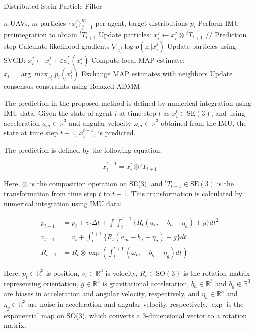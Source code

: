 \documentclass[a4paper,fleqn,10pt,twocolumn]{SICE_ISCS}
\begin{document}
\begin{algorithm}
\caption{Distributed Stein Particle Filter}
\begin{algorithmic}[1]
\REQUIRE $n$ UAVs, $m$ particles $\{x_i^j\}_{j=1}^m$ per agent, target distributions $p_i$
    \STATE Perform IMU preintegration to obtain $^t T_{t+1}$
    \STATE Update particles: $x_i^j \leftarrow x_i^j \otimes \, ^t T_{t+1}$ \quad // Prediction step
        \STATE Calculate likelihood gradients $\nabla_{x_i^j} \log p(z_i | x_i^j)$
        \STATE Update particles using SVGD: $x_i^j \leftarrow x_i^j + \varepsilon \phi_i^*(x_i^j)$
        \STATE Compute local MAP estimate: $\hat{x}_i = \arg\max_{x_i^j} p_i(x_i^j)$
        \STATE Exchange MAP estimates with neighbors
        \STATE Update consensus constraints using Relaxed ADMM
    \ENDFOR
\ENDFOR
\end{algorithmic}
\end{algorithm}

The prediction in the proposed method is defined by numerical integration using IMU data. Given the state of agent $i$ at time step $t$ as $x_i^t \in \mathrm{SE}(3)$, and using acceleration $a_m \in \mathbb{R}^3$ and angular velocity $\omega_m \in \mathbb{R}^3$ obtained from the IMU, the state at time step $t+1$, $x_i^{t+1}$, is predicted.

The prediction is defined by the following equation:

$$x_i^{t+1} = x_i^t \otimes {}^t T_{t+1}$$

Here, $\otimes$ is the composition operation on SE(3), and ${}^t T_{t+1} \in \mathrm{SE}(3)$ is the transformation from time step $t$ to $t+1$. This transformation is calculated by numerical integration using IMU data:

$$
\begin{aligned}
p_{t+1} &= p_t + v_t \Delta t + \int \int_{t}^{t+1} \{R_t(a_m - b_a - \eta_a) + g\} dt^2 \\
v_{t+1} &= v_t + \int_{t}^{t+1} \{R_t(a_m - b_a - \eta_a) + g\} dt \\
R_{t+1} &= R_t \otimes \exp\left(\int_{t}^{t+1} (\omega_m - b_g - \eta_g) dt\right)
\end{aligned}
$$

Here, $p_t \in \mathbb{R}^3$ is position, $v_t \in \mathbb{R}^3$ is velocity, $R_t \in \mathrm{SO}(3)$ is the rotation matrix representing orientation, $g \in \mathbb{R}^3$ is gravitational acceleration, $b_a \in \mathbb{R}^3$ and $b_g \in \mathbb{R}^3$ are biases in acceleration and angular velocity, respectively, and $\eta_a \in \mathbb{R}^3$ and $\eta_g \in \mathbb{R}^3$ are noise in acceleration and angular velocity, respectively. $\exp$ is the exponential map on SO(3), which converts a 3-dimensional vector to a rotation matrix.
\end{document}

